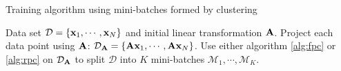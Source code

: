 \begin{algorithm} 
	\caption{Training algorithm using mini-batches formed by clustering} 
	\label{alg:mini-batches}  
	\begin{algorithmic} [1]                 %
		\REQUIRE Data set $\mathcal{D}=\{\mathbf{x}_1,\cdots,\mathbf{x}_N\}$ and initial linear transformation $\mathbf{A}$.
		\REPEAT
			\STATE Project each data point using $\mathbf{A}$:  $\mathcal{D}_{\mathbf{A}}=\{\mathbf{A}\mathbf{x}_1,\cdots,\mathbf{A}\mathbf{x}_N\}$.
			\STATE Use either algorithm \ref{alg:fpc} or \ref{alg:rpc} on $\mathcal{D}_{\mathbf{A}}$ to split $\mathcal{D}$  into $K$ mini-batches $\mathcal{M}_1,\cdots,\mathcal{M}_K$.
			\ENDFOR
	\end{algorithmic}
\end{algorithm}

